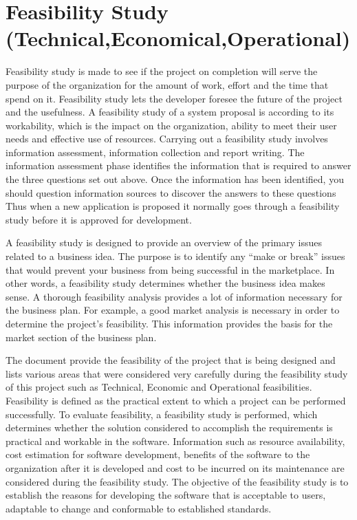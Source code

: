 \section{Feasibility Study (Technical,Economical,Operational)}
Feasibility study is made to see if the project on completion will serve the purpose of the organization for the amount of work, effort and the time that spend on it. Feasibility study lets the developer foresee the future of the project and the usefulness. A feasibility study of a system proposal is according to its workability, which is the impact on the organization, ability to meet their user needs and effective use of resources. Carrying out a feasibility study involves information assessment, information collection and report writing. The information assessment phase identifies the information that is required to answer the three questions set out above. Once the information has been identified, you should question information sources to discover the answers to these questions Thus when a new application is proposed it normally goes through a feasibility study before it is approved for development.

A feasibility study is designed to provide an overview of the primary issues related to a business idea.  The purpose is to identify any “make or break” issues that would prevent your business from being successful in the marketplace. In other words, a feasibility study determines whether the business idea makes sense. A thorough feasibility analysis provides a lot of information necessary for the business plan.  For example, a good market analysis is necessary in order to determine the project’s feasibility.  This information provides the basis for the market section of the business plan.

The document provide the feasibility of the project that is being designed and lists various areas that were considered very carefully during the feasibility study of this project such as Technical, Economic and Operational feasibilities. Feasibility is defined as the practical extent to which a project can be performed successfully. To evaluate feasibility, a feasibility study is performed, which determines whether the solution considered to accomplish the requirements is practical and workable in the software. Information such as resource availability, cost estimation for software development, benefits of the software to the organization after it is developed and cost to be incurred on its maintenance are considered during the feasibility study. The objective of the feasibility study is to establish the reasons for developing the software that is acceptable to users, adaptable to change and conformable to established standards.

